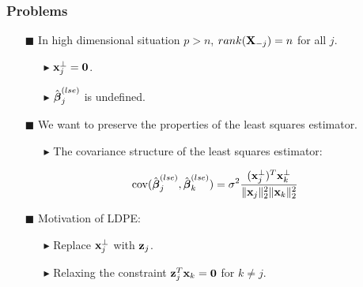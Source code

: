 \begin{frame}
\frametitle{Problems}
\begin{itemize}

\item[$\blacksquare$] In high dimensional situation $p>n$, $rank(\mbox{\bf X}_{-j})=n$ for all $j$. %
\begin{itemize}
\item[$\blacktriangleright$] $\mbox{\bf x}^{\bot}_{j}=\mbox{\bf 0}$.
\item[$\blacktriangleright$] $\hat{\mbox{\boldmath $\beta$}}^{(lse)}_{j}$ is undefined.
\end{itemize}
\item[$\blacksquare$] We want to preserve the properties of the least squares estimator.
\begin{itemize}
\item[$\blacktriangleright$] The covariance structure of the least squares estimator:
\end{itemize}
\begin{equation}
\mathrm{cov}(\hat{\mbox{\boldmath $\beta$}}^{(lse)}_{j},\hat{\mbox{\boldmath $\beta$}}^{(lse)}_{k})=\sigma^{2} \frac{(\mbox{\bf x}^{\bot}_{j})^T \mbox{\bf x}^{\bot}_{k}}{\|\mbox{\bf x}_{j}\|^{2}_{2}\|\mbox{\bf x}_{k}\|^{2}_{2}}
\end{equation}
\item[$\blacksquare$] Motivation of LDPE:
\begin{itemize}
      \item[$\blacktriangleright$] Replace $\mbox{\bf x}^{\bot}_{j}$ with $\mbox{\bf z}_{j}$.
      \medskip
      \item[$\blacktriangleright$] Relaxing the constraint $\mbox{\bf z}_{j}^T \mbox{\bf x}_{k}=\mbox{\bf 0}$ for $k\neq j$.
\vspace{3mm}

\end{itemize}

\end{itemize}


\end{frame}

